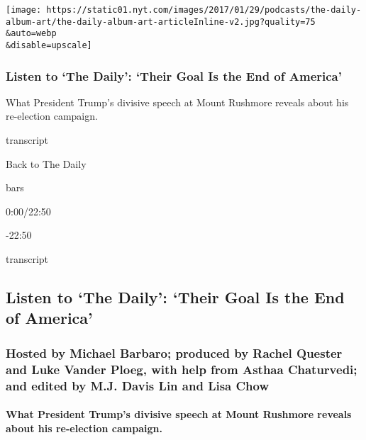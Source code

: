 \texttt{[image: https://static01.nyt.com/images/2017/01/29/podcasts/the-daily-album-art/the-daily-album-art-articleInline-v2.jpg?quality=75\\\&auto=webp\\\&disable=upscale]}

\hypertarget{listen-to-the-daily-their-goal-is-the-end-of-america}{%
\subsubsection{Listen to `The Daily': `Their Goal Is the End of
America'}\label{listen-to-the-daily-their-goal-is-the-end-of-america}}

What President Trump's divisive speech at Mount Rushmore reveals about
his re-election campaign.

transcript

Back to The Daily

bars

0:00/22:50

-22:50

transcript

\hypertarget{listen-to-the-daily-their-goal-is-the-end-of-america-1}{%
\subsection{Listen to `The Daily': `Their Goal Is the End of
America'}\label{listen-to-the-daily-their-goal-is-the-end-of-america-1}}

\hypertarget{hosted-by-michael-barbaro-produced-by-rachel-quester-and-luke-vander-ploeg-with-help-from-asthaa-chaturvedi-and-edited-by-mj-davis-lin-and-lisa-chow}{%
\subsubsection{Hosted by Michael Barbaro; produced by Rachel Quester and
Luke Vander Ploeg, with help from Asthaa Chaturvedi; and edited by M.J.
Davis Lin and Lisa
Chow}\label{hosted-by-michael-barbaro-produced-by-rachel-quester-and-luke-vander-ploeg-with-help-from-asthaa-chaturvedi-and-edited-by-mj-davis-lin-and-lisa-chow}}

\hypertarget{what-president-trumps-divisive-speech-at-mount-rushmore-reveals-about-his-re-election-campaign}{%
\paragraph{What President Trump's divisive speech at Mount Rushmore
reveals about his re-election
campaign.}\label{what-president-trumps-divisive-speech-at-mount-rushmore-reveals-about-his-re-election-campaign}}

